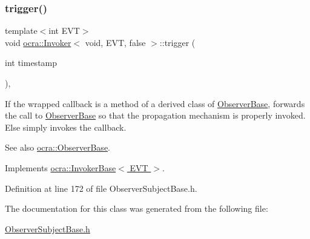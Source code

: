\subsubsection{\texorpdfstring{trigger()}{trigger()}}
{\footnotesize\ttfamily template$<$int E\+VT$>$ \\
void \hyperlink{classocra_1_1Invoker}{ocra\+::\+Invoker}$<$ void, E\+VT, false $>$\+::trigger (\begin{DoxyParamCaption}\item[{int}]{timestamp }\end{DoxyParamCaption})\hspace{0.3cm}{\ttfamily [inline]}, {\ttfamily [virtual]}}

If the wrapped callback is a method of a derived class of \hyperlink{classocra_1_1ObserverBase}{Observer\+Base}, forwards the call to \hyperlink{classocra_1_1ObserverBase}{Observer\+Base} so that the propagation mechanism is properly invoked. Else simply invokes the callback. \begin{DoxySeeAlso}{See also}
\hyperlink{classocra_1_1ObserverBase}{ocra\+::\+Observer\+Base}. 
\end{DoxySeeAlso}


Implements \hyperlink{classocra_1_1InvokerBase_ae4d7537a1b2c0aa9b5188c5da8423289}{ocra\+::\+Invoker\+Base$<$ E\+V\+T $>$}.



Definition at line 172 of file Observer\+Subject\+Base.\+h.



The documentation for this class was generated from the following file\+:\begin{DoxyCompactItemize}
\item 
\hyperlink{ObserverSubjectBase_8h}{Observer\+Subject\+Base.\+h}\end{DoxyCompactItemize}

